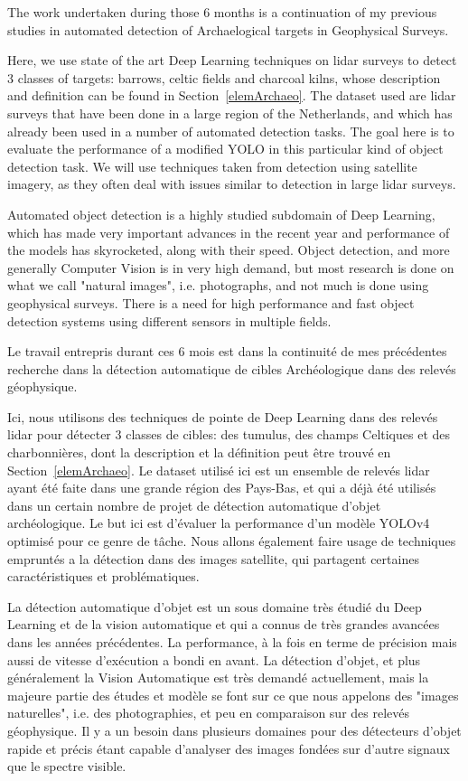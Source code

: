 The work undertaken during those 6 months is a continuation of my previous studies in automated detection of Archaelogical targets in Geophysical Surveys. 

Here, we use state of the art Deep Learning techniques on \gls{lidar} surveys to detect 3 classes of targets: barrows, celtic fields and charcoal kilns, whose description and definition can be found in Section~\ref{elemArchaeo}. The dataset used are \gls{lidar} surveys that have been done in a large region of the Netherlands, and which has already been used in a number of automated detection tasks. The goal here is to evaluate the performance of a modified YOLO\cite{yolov4} in this particular kind of object detection task. We will use techniques taken from detection using satellite imagery, as they often deal with issues similar to detection in large \gls{lidar} surveys. 

Automated object detection is a highly studied subdomain of Deep Learning, which has made very important advances in the recent year and performance of the models has skyrocketed, along with their speed. Object detection, and more generally Computer Vision is in very high demand, but most research is done on what we call "natural images", i.e. photographs, and not much is done using geophysical surveys. There is a need for high performance and fast object detection systems using different sensors in multiple fields. 

Le travail entrepris durant ces 6 mois est dans la continuité de mes précédentes recherche dans la détection automatique de cibles Archéologique dans des relevés géophysique. 

Ici, nous utilisons des techniques de pointe de Deep Learning dans des relevés \gls{lidar} pour détecter 3 classes de cibles: des tumulus, des champs Celtiques et des charbonnières, dont la description et la définition peut être trouvé en Section~\ref{elemArchaeo}. Le dataset utilisé ici est un ensemble de relevés \gls{lidar} ayant été faite dans une grande région des Pays-Bas, et qui a déjà été utilisés dans un certain nombre de projet de détection automatique d'objet archéologique. Le but ici est d'évaluer la performance d'un modèle YOLOv4\cite{yolov4} optimisé pour ce genre de tâche. Nous allons également faire usage de techniques empruntés a la détection dans des images satellite, qui partagent certaines caractéristiques et problématiques. 

La détection automatique d'objet est un sous domaine très étudié du Deep Learning et de la vision automatique et qui a connus de très grandes avancées dans les années précédentes. La performance, à la fois en terme de précision mais aussi de vitesse d'exécution a bondi en avant. La détection d'objet, et plus généralement la Vision Automatique est très demandé actuellement, mais la majeure partie des études et modèle se font sur ce que nous appelons des "images naturelles", i.e. des photographies, et peu en comparaison sur des relevés géophysique. Il y a un besoin dans plusieurs domaines pour des détecteurs d'objet rapide et précis étant capable d'analyser des images fondées sur d'autre signaux que le spectre visible.
